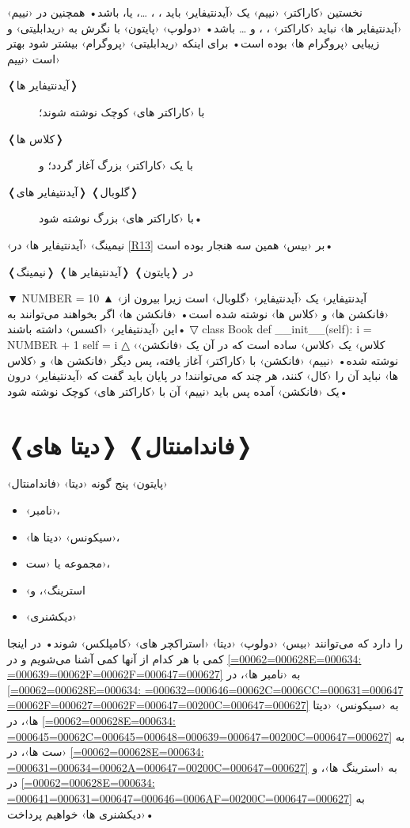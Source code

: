 \documentclass[openany, twocolumn]{book}
\begin{document}
نخستین ‹کاراکتر› ‹نییم› یک ‹آیدنتیفایر› باید ، ، \ldots ، یا،  باشد• همچنین در ‹نییم› ‹آیدنتیفایر ها› نباید ‹کاراکتر› ، \code{$}، و \ldots{} باشد• ‹دولوپ› ‹پایتون› با نگرش به ‹ریدابلیتی› و زیبایی ‹پروگرام ها› بوده است• برای اینکه ‹ریدابلیتی› ‹پروگرام› بیشتر شود بهتر است ‹نییم›
\begin{description}
\item [{❬آیدنتیفایر ها❭}] با ‹کاراکتر های› کوچک نوشته شوند؛
\item [{❬کلاس ها❭}] با یک ‹کاراکتر› بزرگ آغاز گردد؛ و
\item [{❬آیدنتیفایر های❭ ❬گلوبال❭}] با ‹کاراکتر های› بزرگ نوشته شود•
\end{description}
‹نیمینگ› ‹آیدنتیفایر ها› در \ref{R13} بر ‹بیس› همین سه هنجار بوده است•

\begin{Program}
\caption{❬نیمینگ❭ ❬آیدنتیفایر ها❭ در ❬پایتون❭\label{R13}}

▼
NUMBER = 10
▲
 ‹آیدنتیفایر›  یک ‹آیدنتیفایر› ‹گلوبال› است زیرا بیرون از ‹فانکشن ها› و ‹کلاس ها› نوشته شده است• ‹فانکشن ها› اگر بخواهند می‌توانند به این ‹آیدنتیفایر› ‹اکسس› داشته باشند• 
▽
class Book
	def __init__(self):
		i = NUMBER + 1
		self = i
△
 ‹کلاس›  یک ‹کلاس› ساده است که در آن یک ‹فانکشن› نوشته شده• ‹نییم› ‹فانکشن›  با ‹کاراکتر› \code{_} آغاز یافته، پس دیگر ‹فانکشن ها› و ‹کلاس ها› نباید آن را ‹کال› کنند، هر چند که می‌توانند! در پایان باید گفت که ‹آیدنتیفایر›  درون یک ‹فانکشن› آمده پس باید ‹نییم› آن با ‹کاراکتر های› کوچک نوشته شود•
\end{Program}

\chapter{❬دیتا های❭ ❬فاندامنتال❭}
‹پایتون› پنج گونه ‹دیتا› ‹فاندامنتال›
\begin{itemize}
\item ‹نامبر›،
\item ‹سیکونس› ‹دیتا ها›،
\item مجموعه یا ‹ست›،
\item ‹استرینگ›، و
\item ‹دیکشنری›
\end{itemize}
را دارد که می‌توانند ‹بیس› ‹دولوپ› ‹دیتا› ‹استراکچر های› ‹کامپلکس› شوند• در اینجا کمی با هر کدام از آنها کمی آشنا می‌شویم و در \ref{=000628=00062E=000634: =000639=00062F=00062F=000647=000627} به ‹نامبر ها›، در \ref{=000628=00062E=000634: =000632=000646=00062C=0006CC=000631=000647 =00062F=000627=00062F=000647=00200C=000647=000627} به ‹سیکونس› ‹دیتا ها›، در \ref{=000628=00062E=000634: =000645=00062C=000645=000648=000639=000647=00200C=000647=000627} به ‹ست ها›، در \ref{=000628=00062E=000634: =000631=000634=00062A=000647=00200C=000647=000627} به ‹استرینگ ها›، و در \ref{=000628=00062E=000634: =000641=000631=000647=000646=0006AF=00200C=000647=000627} به ‹دیکشنری ها› خواهیم پرداخت•
\end{document}
